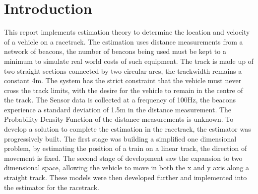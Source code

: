 \section{Introduction}
\label{sec:introduction}

This report implements estimation theory to determine the location and velocity of a vehicle on a racetrack. The estimation uses distance measurements from a network of beacons, the number of beacons being used must be kept to a minimum to simulate real world costs of such equipment. The track is made up of two straight sections connected by two circular arcs, the trackwidth remains a constant 4m. The system has the strict constraint that the vehicle must never cross the track limits, with the desire for the vehicle to remain in the centre of the track.
The Sensor data is collected at a frequency of 100Hz, the beacons experience a standard deviation of 1.5m in the distance measurement. The Probability Density Function of the distance measurements is unknown. 
To develop a solution to complete the estimation in the racetrack, the estimator was progressively built. The first stage was building a simplified one dimensional problem, by estimating the position of a train on a linear track, the direction of movement is fixed. The second stage of development saw the expansion to two dimensional space, allowing the vehicle to move in both the x and y axis along a straight track. 
These models were then developed further and implemented into the estimator for the racetrack.